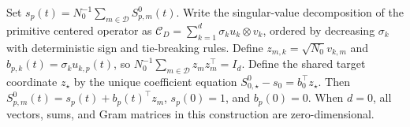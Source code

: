 Set \(s_p(t)=N_0^{-1}\sum_{m\in\mathcal D}S^0_{p,m}(t)\). Write the singular-value decomposition of the primitive centered operator as \(\mathcal C_D=\sum_{k=1}^d\sigma_k u_k\otimes v_k\), ordered by decreasing \(\sigma_k\) with deterministic sign and tie-breaking rules. Define \(z_{m,k}=\sqrt{N_0}v_{k,m}\) and \(b_{p,k}(t)=\sigma_k u_{k,p}(t)\), so \(N_0^{-1}\sum_{m\in\mathcal D}z_mz_m^\top=I_d\). Define the shared target coordinate \(z_\star\) by the unique coefficient equation \(S^0_{0,\star}-s_0=b_0^\top z_\star\). Then \(S^0_{p,m}(t)=s_p(t)+b_p(t)^\top z_m\), \(s_p(0)=1\), and \(b_p(0)=0\). When \(d=0\), all vectors, sums, and Gram matrices in this construction are zero-dimensional.